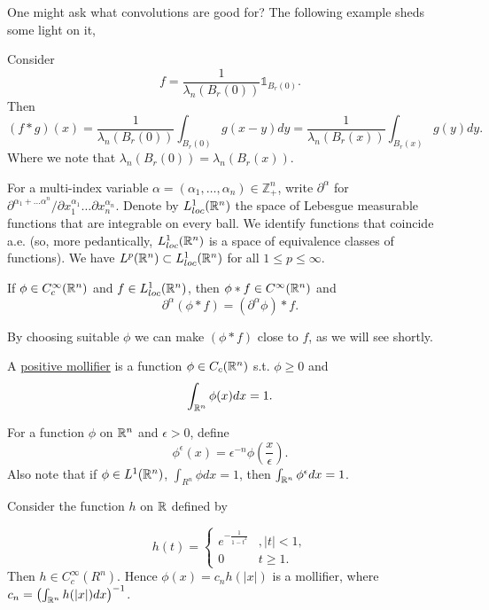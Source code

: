 One might ask what convolutions are good for? The following example sheds some light on it,
\begin{example}
    Consider \[f = \frac{1}{\lambda_n(B_r(0))}\mathds{1}_{B_r(0)}.\]
    Then \[(f*g)(x) =  \frac{1}{\lambda_n(B_r(0))} \int_{B_r(0)} g(x-y)dy =  \frac{1}{\lambda_n(B_r(x))}\int_{B_r(x)}g(y)dy.\]
    Where we note that $\lambda_n(B_r(0)) = \lambda_n(B_r(x))$.
\end{example} 
For a multi-index variable $\alpha = (\alpha_1,\ldots,\alpha_n)\in \mathbb{Z}_+^n$, write $\partial^\alpha$ for $\partial^{\alpha_1+\ldots \alpha^n}/\partial x_1^{\alpha_1}\ldots\partial x_n^{\alpha_n}$.
Denote by $L^1_{loc}(\mathbb{R}^n)$ the space of Lebesgue measurable functions that are integrable on every ball. We identify functions that coincide a.e. (so, more pedantically,
 $L^1_{loc}(\mathbb{R}^n)$ is a space of equivalence classes of functions). We have $L^p(\mathbb{R}^n)\subset L_{loc}^1(\mathbb{R}^n)$ for all $1\leq p\leq \infty$.

 \begin{lemma}
    If $\phi\in C_c^\infty(\mathbb{R}^n)$ and $f\in L_{loc}^1(\mathbb{R}^n)$, then $\phi*f\in C^\infty (\mathbb{R}^n)$ and \[\partial^\alpha (\phi*f)=(\partial^\alpha \phi)*f.\]
 \end{lemma}

 By choosing suitable $\phi$ we can make $(\phi*f)$ close to $f$, as we will see shortly.
 \begin{definition}
    A \underline{positive mollifier} is a function $\phi\in C_c(\mathbb{R}^n)$ s.t. $\phi\geq 0$ and \[\int_{\mathbb{R}^n}\phi(x)dx=1.\]

 \end{definition}

 For a function $\phi$ on $\mathbb{R}^n$ and $\epsilon>0$, define \[\phi^\epsilon (x) = \epsilon ^{-n}\phi(\frac{x}{\epsilon}).\]
 Also note that if $\phi\in L^1(\mathbb{R}^n)$, $\int_{R^n}\phi dx=1$, then $\int_{\mathbb{R}^n}\phi^\epsilon dx =1$.

 \begin{example}
    Consider the function $h$ on $\mathbb{R}$ defined by 

    \[ h(t) = \begin{cases} 
        e^{-\frac{1}{1-t^2}} &, |t|<1,  \\
        0 & t\geq 1.  
     \end{cases}
  \]
  Then $h\in C_c^\infty(R^n)$. Hence $\phi(x)=c_n h(|x|)$ is a mollifier, where $c_n = \left(\int_{\mathbb{R}^n}h(|x|)dx\right)^{-1}$.
 \end{example}

